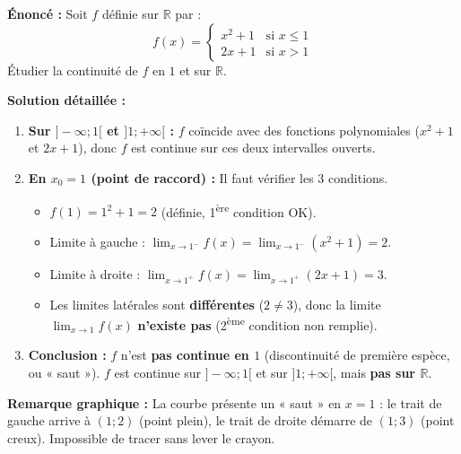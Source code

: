 \documentclass[11pt]{article}
\begin{document}
\begin{exoresolu}
\textbf{Énoncé :} Soit $f$ définie sur $\mathbb{R}$ par :
\[
f(x) = \begin{cases}
x^2 + 1 & \text{si } x \leq 1 \\
2x + 1 & \text{si } x > 1
\end{cases}
\]
Étudier la continuité de $f$ en $1$ et sur $\mathbb{R}$.

\textbf{Solution détaillée :}
\begin{enumerate}
    \item \textbf{Sur $]-\infty;1[$ et $]1;+\infty[$ :} $f$ coïncide avec des fonctions polynomiales ($x^2+1$ et $2x+1$), donc $f$ est continue sur ces deux intervalles ouverts.
    \item \textbf{En $x_0 = 1$ (point de raccord) :} Il faut vérifier les 3 conditions.
          \begin{itemize}
              \item $f(1) = 1^2+1 = 2$ (définie, 1\textsuperscript{ère} condition OK).
              \item Limite à gauche : $\lim_{x \to 1^-} f(x) = \lim_{x \to 1^-} (x^2+1) = 2$.
              \item Limite à droite : $\lim_{x \to 1^+} f(x) = \lim_{x \to 1^+} (2x+1) = 3$.
              \item Les limites latérales sont \textbf{différentes} ($2 \neq 3$), donc la limite $\lim_{x \to 1} f(x)$ \textbf{n'existe pas} (2\textsuperscript{ème} condition non remplie).
          \end{itemize}
    \item \textbf{Conclusion :} $f$ n'est \textbf{pas continue en $1$} (discontinuité de première espèce, ou « saut »).
          $f$ est continue sur $]-\infty;1[$ et sur $]1;+\infty[$, mais \textbf{pas sur $\mathbb{R}$}.
\end{enumerate}
\tcblower
\textbf{Remarque graphique :} La courbe présente un « saut » en $x=1$ : le trait de gauche arrive à $(1;2)$ (point plein), le trait de droite démarre de $(1;3)$ (point creux). Impossible de tracer sans lever le crayon.
\end{exoresolu}
\end{document}
